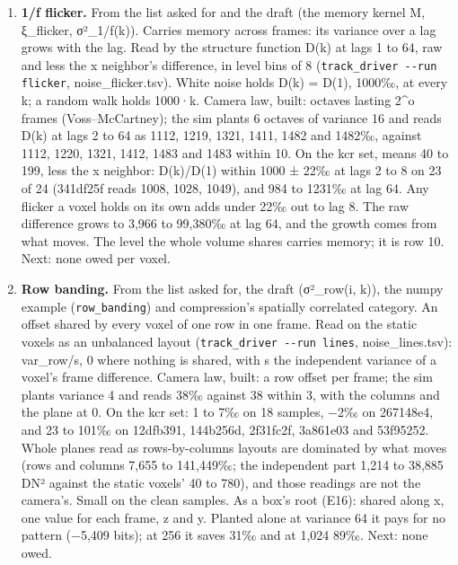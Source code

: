 \begin{enumerate}
\begin{itemize}
\item Prior art, cited from knowledge. The photon transfer method, reading gain, read noise and dark signal from the mean and variance of flat, dark and bias frames, and kTC noise removed by correlated double sampling: J. R. Janesick, “Photon Transfer: DN → λ”, SPIE Press, 2007.
\end{itemize}
\item \textbf{1/f flicker.} From the list asked for and the draft (the memory kernel M, ξ\_\allowbreak{}flicker, σ²\_\allowbreak{}1/f(k)). Carries memory across frames: its variance over a lag grows with the lag. Read by the structure function D(k) at lags 1 to 64, raw and less the x neighbor's difference, in level bins of 8 (\texttt{track\_\allowbreak{}driver -\allowbreak{}-\allowbreak{}run flicker}, noise\_\allowbreak{}flicker.tsv). White noise holds D(k) = D(1), 1000‰, at every k; a random walk holds 1000·k. Camera law, built: octaves lasting 2\textasciicircum{}o frames (Voss–McCartney); the sim plants 6 octaves of variance 16 and reads D(k) at lags 2 to 64 as 1112, 1219, 1321, 1411, 1482 and 1482‰, against 1112, 1220, 1321, 1412, 1483 and 1483 within 10. On the kcr set, means 40 to 199, less the x neighbor: D(k)/D(1) within 1000 ± 22‰ at lags 2 to 8 on 23 of 24 (341df25f reads 1008, 1028, 1049), and 984 to 1231‰ at lag 64. Any flicker a voxel holds on its own adds under 22‰ out to lag 8. The raw difference grows to 3,966 to 99,380‰ at lag 64, and the growth comes from what moves. The level the whole volume shares carries memory; it is row 10. Next: none owed per voxel.
\item \textbf{Row banding.} From the list asked for, the draft (σ²\_\allowbreak{}row(i, k)), the numpy example (\texttt{row\_\allowbreak{}banding}) and compression's spatially correlated category. An offset shared by every voxel of one row in one frame. Read on the static voxels as an unbalanced layout (\texttt{track\_\allowbreak{}driver -\allowbreak{}-\allowbreak{}run lines}, noise\_\allowbreak{}lines.tsv): var\_\allowbreak{}row/s, 0 where nothing is shared, with s the independent variance of a voxel's frame difference. Camera law, built: a row offset per frame; the sim plants variance 4 and reads 38‰ against 38 within 3, with the columns and the plane at 0. On the kcr set: 1 to 7‰ on 18 samples, −2‰ on 267148e4, and 23 to 101‰ on 12dfb391, 144b256d, 2f31fc2f, 3a861e03 and 53f95252. Whole planes read as rows-by-columns layouts are dominated by what moves (rows and columns 7,655 to 141,449‰; the independent part 1,214 to 38,885 DN² against the static voxels' 40 to 780), and those readings are not the camera's. Small on the clean samples. As a box's root (E16): shared along x, one value for each frame, z and y. Planted alone at variance 64 it pays for no pattern (−5,409 bits); at 256 it saves 31‰ and at 1,024 89‰. Next: none owed.

\end{enumerate}
